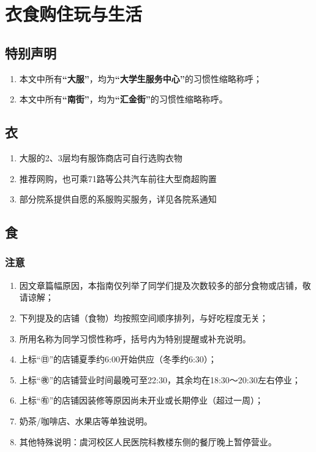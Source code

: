 \chapter[衣食购住玩与生活]{衣食购住玩与生活}

\section*{特别声明}
\begin{enumerate}
    \item 本文中所有\textbf{“大服”}，均为\textbf{“大学生服务中心”}的习惯性缩略称呼；
    \item 本文中所有\textbf{“南街”}，均为\textbf{“汇金街”}的习惯性缩略称呼。
\end{enumerate}
\section[衣]{衣}
\begin{enumerate}
    \item 大服的2、3层均有服饰商店可自行选购衣物
    \item 推荐网购，也可乘71路等公共汽车前往大型商超购置
    \item 部分院系提供自愿的系服购买服务，详见各院系通知
\end{enumerate}

\section[食]{食}
\subsection*{注意}
\begin{enumerate}
    \item 因文章篇幅原因，本指南仅列举了同学们提及次数较多的部分食物或店铺，敬请谅解；
    \item 下列提及的店铺（食物）均按照空间顺序排列，与好吃程度无关；
    \item 所用名称为同学习惯性称呼，括号内为特别提醒或补充说明。
    \item 上标“㊐”的店铺夏季约6:00开始供应（冬季约6:30）；
    \item 上标“㊰”的店铺营业时间最晚可至22:30，其余均在18:30～20:30左右停业；
    \item 上标“㊒”的店铺因装修等原因尚未开业或长期停业（超过一周）；
    \item 奶茶/咖啡店、水果店等单独说明。
    \item 其他特殊说明：虞河校区人民医院科教楼东侧的餐厅晚上暂停营业。
\end{enumerate}

